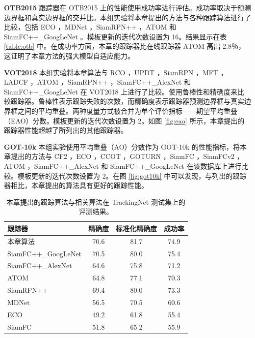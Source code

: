\textbf{OTB2015} 跟踪器在 OTB2015 上的性能使用成功率进行评估。成功率取决于预测边界框和真实边界框的交并比。本组实验将本章提出的方法与各种跟踪算法进行了比较，包括 ECO \cite{danelljan2017eco}，MDNet \cite{MDNet}，SiamRPN++ \cite{SiamRPN++}，ATOM \cite{danelljan2019atom} 和 SiamFC++\_GoogLeNet \cite{SiamFC++}。模板更新的迭代次数设置为 16。结果显示在表 \ref{table:otb} 中。在成功率方面，本章的跟踪器比在线跟踪器 ATOM 高出 2.8％，这证明了本章方法的强大模型自适应能力。

\textbf{VOT2018} 本组实验将本章算法与 RCO \cite{kristan2018sixth}，UPDT \cite{bhat2018unveiling}，SiamRPN \cite{SiamRPN}，MFT \cite{kristan2018sixth}，LADCF \cite{kristan2018sixth}，ATOM \cite{danelljan2019atom}，SiamRPN++ \cite{SiamRPN++}，SiamFC++\_AlexNet \cite{SiamFC++} 和 SiamFC++\_GoogLeNet \cite{SiamFC++} 在 VOT2018 上进行了比较。使用鲁棒性和精确度来比较跟踪器。鲁棒性表示跟踪失败的次数，而精确度表示跟踪器预测边界框与真实边界框之间的平均重叠。两种度量方式被合并为单个评价指标——期望平均重叠（EAO）分数。模板更新的迭代次数设置为 2。如图 \ref{fig:eao} 所示，本章提出的跟踪器性能超越了所列出的其他跟踪器。

\textbf{GOT-10k} 本组实验使用平均重叠（AO）分数作为 GOT-10k \cite{GOT-10k} 的性能指标，将本章提出的方法与 CF2 \cite{CF2}，ECO \cite{danelljan2017eco}，CCOT \cite{danelljan2016beyond}，GOTURN \cite{GOTURN}，SiamFC \cite{SiamFC}，SiamFCv2 \cite{valmadre2017end}，ATOM \cite{danelljan2019atom}，SiamFC++\_AlexNet \cite{SiamFC++} 和 SiamFC++\_GoogLeNet \cite{SiamFC++} 在该数据库上进行比较。模板更新的迭代次数设置为 2。在图 \ref{fig:got10k} 中可以发现，与列出的跟踪器相比，本章提出的算法具有更好的跟踪性能。

\nopagebreak[3]
\begin{table}[t!]
\centering
\caption{本章提出的跟踪算法与相关算法在 TrackingNet \cite{muller2018trackingnet} 测试集上的评测结果。}
\begin{tabular}{l c c c}
\toprule
跟踪器   &  精确度   &  标准化精确度 & 成功率  \\
\midrule
本章算法  &  70.6&  81.7 &74.9 \\
SiamFC++\_GoogLeNet \cite{SiamFC++} & 70.5 & 80.0 & 75.4 \\
SiamFC++\_AlexNet \cite{SiamFC++} & 64.6 & 75.8 & 71.2 \\
ATOM \cite{danelljan2019atom} & 64.8 & 77.1 & 70.3 \\
SiamRPN++ \cite{SiamRPN++} &  69.4 & 80.0 &73.3 \\
MDNet \cite{MDNet} &  56.5&  70.5 &60.6 \\
ECO	\cite{danelljan2017eco} &  49.2&  61.8 &55.4 \\
SiamFC \cite{SiamFC} &  51.8&  65.2 &55.9 \\
\bottomrule
\end{tabular}
\label{tabel:trackingnet}
\end{table}
\nopagebreak[3]


